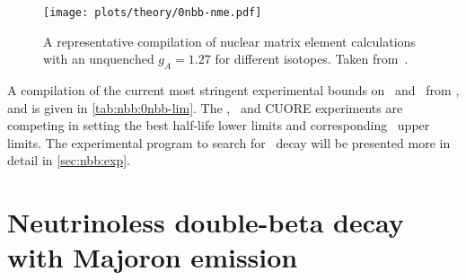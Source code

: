 \begin{figure}
  \centering
  \texttt{[image: plots/theory/0nbb-nme.pdf]}
  \caption{%
    A representative compilation of nuclear matrix element calculations with an unquenched
    $g_A=1.27$ for different isotopes. Taken from~\cite{Yao2020}.
  }\label{fig:nbb:nme}
\end{figure}

A compilation of the current most stringent experimental bounds on \thalfzero\ and \mbb\
from \gesix,  and  is given in \cref{tab:nbb:0nbb-lim}. The
\gerda, \kamlandzen\ and CUORE experiments are competing in setting the best half-life
lower limits and corresponding \mbb\ upper limits. The experimental program to search for
\onbb\ decay will be presented more in detail in \cref{sec:nbb:exp}.

\begin{table}
  \centering
  \caption{%
    Compilation of current most stringent 90\% C.L.~experimental bounds on \thalfzero\ and
    \mbb\ from \gesix, \nuc{Te}{130} and \nuc{Xe}{136} experiments. The spread in the
    \mbb\ limits accounts for the uncertainty in the NME values. An unquenched value of of
    axial coupling constant $g_A \simeq 1.27$ is assumed.
  }\label{tab:nbb:0nbb-lim}
  
\end{table}

\section{Neutrinoless double-beta decay with Majoron emission}%
\label{sec:nbb:0nbbx}

